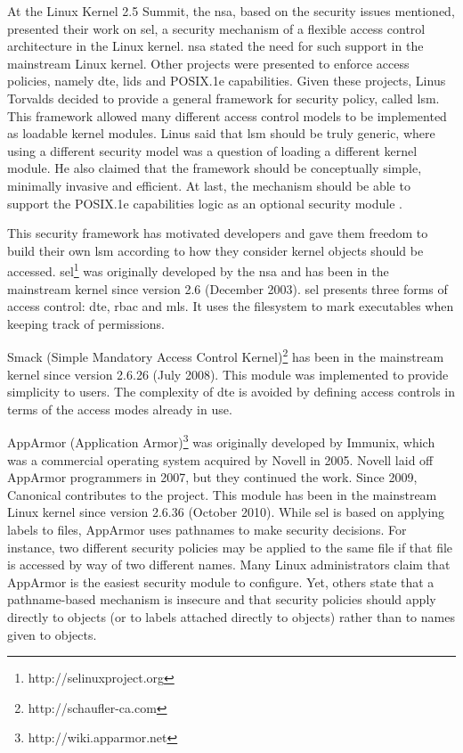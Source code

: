 At the Linux Kernel 2.5 Summit, the \gls{nsa}, based on the security issues mentioned, presented their work on \gls{sel}, a security mechanism of a flexible access control architecture in the Linux kernel. \gls{nsa} stated the need for such support in the mainstream Linux kernel. Other projects were presented to enforce access policies, namely \gls{dte}, \gls{lids} and POSIX.1e capabilities. Given these projects, Linus Torvalds decided to provide a general framework for security policy, called \gls{lsm}. This framework allowed many different access control models to be implemented as loadable kernel modules. Linus said that \gls{lsm} should be truly generic, where using a different security model was a question of loading a different kernel module. He also claimed that the framework should be conceptually simple, minimally invasive and efficient. At last, the mechanism should be able to support the POSIX.1e capabilities logic as an optional security module \cite{WCSMK02}.

This security framework has motivated developers and gave them freedom to build their own \gls{lsm} according to how they consider kernel objects should be accessed. \gls{sel}\footnote{http://selinuxproject.org} was originally developed by the \gls{nsa} and has been in the mainstream kernel since version 2.6 (December 2003). \gls{sel} presents three forms of access control: \gls{dte}, \gls{rbac} and \gls{mls}. It uses the filesystem to mark executables when keeping track of permissions.

Smack (Simple Mandatory Access Control Kernel)\footnote{http://schaufler-ca.com} has been in the mainstream kernel since version 2.6.26 (July 2008). This module was implemented to provide simplicity to users. The complexity of \gls{dte} is avoided by defining access controls in terms of the access modes already in use.

AppArmor (Application Armor)\footnote{http://wiki.apparmor.net} was originally developed by Immunix, which was a commercial operating system acquired by Novell in 2005. Novell laid off AppArmor programmers in 2007, but they continued the work. Since 2009, Canonical contributes to the project. This module has been in the mainstream Linux kernel since version 2.6.36 (October 2010). While \gls{sel} is based on applying labels to files, AppArmor uses pathnames to make security decisions. For instance, two different security policies may be applied  to the same file if that file is accessed by way of two different names. Many Linux administrators claim that AppArmor is the easiest security module to configure. Yet, others state that a pathname-based mechanism is insecure and that security policies should apply directly to objects (or to labels attached directly to objects) rather than to names given to objects.

